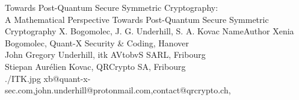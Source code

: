 \documentclass[a4paper,11pt]{article}
\begin{document}
\setcounter{footnote}{0}
\setcounter{figure}{0}



\Aufsatz 
{Towards Post-Quantum Secure Symmetric Cryptography: \\
A Mathematical Perspective}
{Towards Post-Quantum Secure Symmetric Cryptography}
{X. Bogomolec, J. G. Underhill, S. A. Kovac}
{NameAuthor}
{ Xenia Bogomolec, Quant-X Security {\&} Coding, Hanover\\ John Gregory Underhill, itk AVtobvS SARL, Fribourg\\  Stiepan Aurélien Kovac, QRCrypto SA, Fribourg \\}
{./ITK.jpg}
{xb@quant-x-sec.com,john.underhill@protonmail.com,contact@qrcrypto.ch,}
\end{document}
